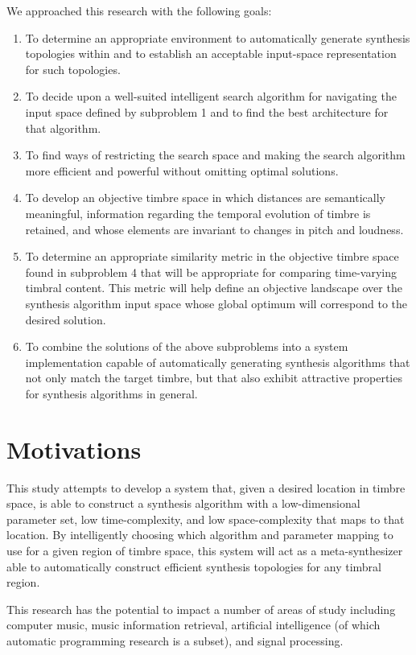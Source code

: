 \documentclass[a4paper,12pt]{report} 	%
\numberwithin{figure}{chapter}
\numberwithin{table}{chapter}
\numberwithin{equation}{chapter}
\begin{document}
\begin{flushleft}
We approached this research with the following goals:
\begin{enumerate}
\item To determine an appropriate environment to automatically generate synthesis topologies within and to establish an acceptable input-space representation for such topologies.
\item To decide upon a well-suited intelligent search algorithm for navigating the input space defined by subproblem 1 and to find the best architecture for that algorithm.
\item To find ways of restricting the search space and making the search algorithm more efficient and powerful without omitting optimal solutions.
\item To develop an objective timbre space in which distances are semantically meaningful, information regarding the temporal evolution of timbre is retained, and whose elements are invariant to changes in pitch and loudness.
\item To determine an appropriate similarity metric in the objective timbre space found in subproblem 4 that will be appropriate for comparing time-varying timbral content. This metric will help define an objective landscape over the synthesis algorithm input space whose global optimum will correspond to the desired solution.
\item To combine the solutions of the above subproblems into a system implementation capable of automatically generating synthesis algorithms that not only match the target timbre, but that also exhibit attractive properties for synthesis algorithms in general.
\end{enumerate}

\section{Motivations}
This study attempts to develop a system that, given a desired location in timbre space, is able to construct a synthesis algorithm with a low-dimensional parameter set, low time-complexity, and low space-complexity that maps to that location. By intelligently choosing which algorithm and parameter mapping to use for a given region of timbre space, this system will act as a meta-synthesizer able to automatically construct efficient synthesis topologies for any timbral region.

This research has the potential to impact a number of areas of study including computer music, music information retrieval, artificial intelligence (of which automatic programming research is a subset), and signal processing.


\end{flushleft}
\end{document}
